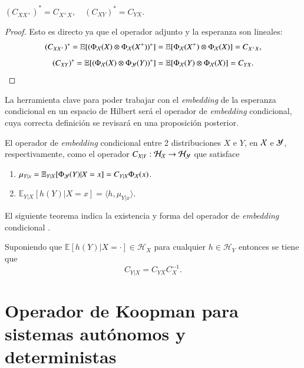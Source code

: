     \begin{cor} \((C_{XX^+})^* = C_{X^+X}, \quad (C_{XY})^* = C_{YX}.\)
    \end{cor}
    \begin{proof}
        Esto es directo ya que el operador adjunto y la esperanza son lineales:
\begin{equation*}
    (C_{X X^+})^* = \mathbb{E} [(\Phi_{\mathcal{X}} (X) \otimes \Phi_{\mathcal{X}} (X^+))^*] = \mathbb{E} [\Phi_{\mathcal{X}} (X^+) \otimes \Phi_{\mathcal{X}} (X)] = C_{X^+X},
\end{equation*}
\begin{equation*}
    (C_{X Y})^* = \mathbb{E} [(\Phi_{\mathcal{X}} (X) \otimes \Phi_{\mathcal{Y}} (Y))^*] = \mathbb{E} [\Phi_{\mathcal{X}} (Y) \otimes \Phi_{\mathcal{X}} (X)] = C_{YX}.
\end{equation*}
    \end{proof}
	
La herramienta clave para poder trabajar con el \textit{embedding} de la esperanza condicional en un espacio de Hilbert será el operador de \textit{embedding} condicional, cuya correcta definición se revisará en una proposición posterior.
\begin{defn}
    El operador de \textit{embedding} condicional entre 2 distribuciones $X$ e $Y$, en $\mathcal{X}$ e $\mathcal{Y}$, respectivamente, como el operador $C_{X|Y} : \mathcal{H}_{\mathcal{X}} \to \mathcal{H}_{\mathcal{Y}}$ que satisface
    \begin{enumerate}
        \item $\mu_{Y|x} = \mathbb{E}_{Y|X}[\Phi_{\mathcal{Y}} (Y)|X=x] = C_{Y|X}\Phi_{\mathcal{X}} (x)$.
        \item $\mathbb{E}_{Y|X}[h(Y)|X=x] = \langle h, \mu_{Y|x} \rangle$.
    \end{enumerate}
\end{defn}
El siguiente teorema indica la existencia y forma del operador de \textit{embedding} condicional \cite{Fukumizu2004DimensionalitySpaces, Song2009HilbertSystems}.
\begin{teo}
    Suponiendo que \( \mathbb{E}[h(Y)|X = \cdot] \in \mathcal{H}_X \) para cualquier \( h \in \mathcal{H}_Y \) entonces se tiene que
    \[ C_{Y|X} = C_{YX} C_{X}^{-1}.\]
\end{teo}

\section{Operador de Koopman para sistemas autónomos y deterministas}

